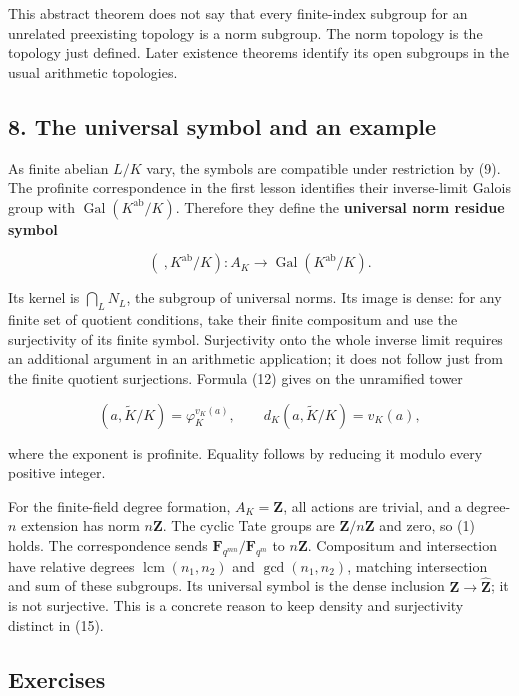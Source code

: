 \documentclass[11pt,a4paper]{article}
\begin{document}
This abstract theorem does not say that every finite-index subgroup for
an unrelated preexisting topology is a norm subgroup. The norm topology
is the topology just defined. Later existence theorems identify its open
subgroups in the usual arithmetic topologies.

\subsection{8. The universal symbol and an
example}\label{the-universal-symbol-and-an-example}

As finite abelian \(L/K\) vary, the symbols are compatible under
restriction by (9). The profinite correspondence in the first lesson
identifies their inverse-limit Galois group with
\(\operatorname{Gal}(K^{\mathrm{ab}}/K)\). Therefore they define the
\textbf{universal norm residue symbol}

\[
(\ ,K^{\mathrm{ab}}/K):A_K\longrightarrow
\operatorname{Gal}(K^{\mathrm{ab}}/K).
\tag{15}
\]

Its kernel is \(\bigcap_L N_L\), the subgroup of universal norms. Its
image is dense: for any finite set of quotient conditions, take their
finite compositum and use the surjectivity of its finite symbol.
Surjectivity onto the whole inverse limit requires an additional
argument in an arithmetic application; it does not follow just from the
finite quotient surjections. Formula (12) gives on the unramified tower

\[
(a,\widetilde K/K)=\varphi_K^{v_K(a)},
\qquad d_K(a,\widetilde K/K)=v_K(a),
\tag{16}
\]

where the exponent is profinite. Equality follows by reducing it modulo
every positive integer.

For the finite-field degree formation, \(A_K=\mathbf Z\), all actions
are trivial, and a degree-\(n\) extension has norm \(n\mathbf Z\). The
cyclic Tate groups are \(\mathbf Z/n\mathbf Z\) and zero, so (1) holds.
The correspondence sends \(\mathbf F_{q^{mn}}/\mathbf F_{q^m}\) to
\(n\mathbf Z\). Compositum and intersection have relative degrees
\(\operatorname{lcm}(n_1,n_2)\) and \(\gcd(n_1,n_2)\), matching
intersection and sum of these subgroups. Its universal symbol is the
dense inclusion \(\mathbf Z\to\widehat{\mathbf Z}\); it is not
surjective. This is a concrete reason to keep density and surjectivity
distinct in (15).

\subsection{Exercises}\label{exercises}
\end{document}
